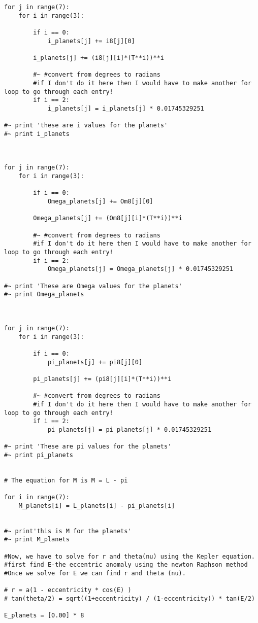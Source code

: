 \documentclass[12pt, leqno]{article}
\begin{document}
\begin{lstlisting}
for j in range(7): 
	for i in range(3): 
		
		if i == 0: 
			i_planets[j] += i8[j][0]
			
		i_planets[j] += (i8[j][i]*(T**i))**i
		
		#~ #convert from degrees to radians 
		#if I don't do it here then I would have to make another for loop to go through each entry! 
		if i == 2: 
			i_planets[j] = i_planets[j] * 0.01745329251

#~ print 'these are i values for the planets'
#~ print i_planets 



for j in range(7): 
	for i in range(3): 
		
		if i == 0: 
			Omega_planets[j] += Om8[j][0]
			
		Omega_planets[j] += (Om8[j][i]*(T**i))**i
		
		#~ #convert from degrees to radians 
		#if I don't do it here then I would have to make another for loop to go through each entry! 
		if i == 2: 
			Omega_planets[j] = Omega_planets[j] * 0.01745329251

#~ print 'These are Omega values for the planets'
#~ print Omega_planets



for j in range(7): 
	for i in range(3): 
		
		if i == 0: 
			pi_planets[j] += pi8[j][0]
			
		pi_planets[j] += (pi8[j][i]*(T**i))**i
		
		#~ #convert from degrees to radians 
		#if I don't do it here then I would have to make another for loop to go through each entry! 
		if i == 2: 
			pi_planets[j] = pi_planets[j] * 0.01745329251

#~ print 'These are pi values for the planets' 
#~ print pi_planets


# The equation for M is M = L - pi 

for i in range(7): 
	M_planets[i] = L_planets[i] - pi_planets[i]


#~ print'this is M for the planets'	
#~ print M_planets

#Now, we have to solve for r and theta(nu) using the Kepler equation. 
#first find E-the eccentric anomaly using the newton Raphson method 
#Once we solve for E we can find r and theta (nu). 

# r = a(1 - eccentricity * cos(E) ) 
# tan(theta/2) = sqrt((1+eccentricity) / (1-eccentricity)) * tan(E/2)

E_planets = [0.00] * 8 


\end{lstlisting}
\end{document}
